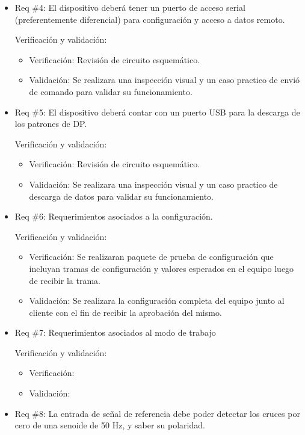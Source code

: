 \documentclass[11pt]{charter}
\begin{document}
\begin{itemize}
\item Req \#4: El dispositivo deberá tener un puerto de acceso serial (preferentemente diferencial) para configuración y acceso a datos remoto.

Verificación y validación:

\begin{itemize}
\item Verificación: Revisión de circuito esquemático. 
\item Validación: Se realizara una inspección visual y un caso practico de envió de comando para validar su funcionamiento.
\end{itemize}

\item Req \#5: El dispositivo deberá contar con un puerto USB para la descarga de los patrones de DP.

Verificación y validación:

\begin{itemize}
\item Verificación: Revisión de circuito esquemático.
\item Validación: Se realizara una inspección visual y un caso practico de descarga de datos para validar su funcionamiento.
\end{itemize}

\item Req \#6: Requerimientos asociados a la configuración.

Verificación y validación:

\begin{itemize}
\item Verificación: Se realizaran paquete de prueba de configuración que incluyan tramas de configuración y valores esperados en el equipo luego de recibir la trama.
\item Validación: Se realizara la configuración completa del equipo junto al cliente con el fin de recibir la aprobación del mismo.
\end{itemize}

\item Req \#7: Requerimientos asociados al modo de trabajo

Verificación y validación:

\begin{itemize}
\item Verificación:
\item Validación: 
\end{itemize}

\item Req \#8: La entrada de señal de referencia debe poder detectar los cruces por cero de una senoide de 50 Hz, y saber su polaridad.


\end{itemize}
\end{document}
